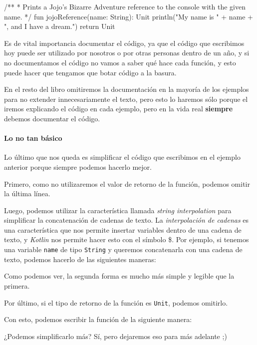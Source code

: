       \begin{kotlin}
        /**
         * Prints a Jojo's Bizarre Adventure reference to the console with the given name.
         */
        fun jojoReference(name: String): Unit {
          println("My name is " + name + ", and I have a dream.")
          return Unit
        }
      \end{kotlin}
      
      Es de vital importancia documentar el código, ya que el código que escribimos hoy puede ser
      utilizado por nosotros o por otras personas dentro de un año, y si no documentamos el código
      no vamos a saber qué hace cada función, y esto puede hacer que tengamos que botar código a la
      basura.

      En el resto del libro omitiremos la documentación en la mayoría de los ejemplos para no
      extender innecesariamente el texto, pero esto lo haremos sólo porque el iremos explicando el
      código en cada ejemplo, pero en la vida real \textbf{siempre} debemos documentar el código.

    \paragraph{Lo no tan básico}
      Lo último que nos queda es simplificar el código que escribimos en el ejemplo anterior porque
      siempre podemos hacerlo mejor.
      
      Primero, como no utilizaremos el valor de retorno de la función, podemos omitir la última 
      línea.
      
      Luego, podemos utilizar la característica llamada \textit{string interpolation} para
      simplificar la concatenación de cadenas de texto.
      La \textit{interpolación de cadenas} es una característica que nos permite insertar variables
      dentro de una cadena de texto, y \textit{Kotlin} nos permite hacer esto con el símbolo \$.
      Por ejemplo, si tenemos una variable \texttt{name} de tipo \texttt{String} y queremos
      concatenarla con una cadena de texto, podemos hacerlo de las siguientes maneras:


      Como podemos ver, la segunda forma es mucho más simple y legible que la primera.

      Por último, si el tipo de retorno de la función es \texttt{Unit}, podemos omitirlo.

      Con esto, podemos escribir la función de la siguiente manera:


      ¿Podemos simplificarlo más?
      Sí, pero dejaremos eso para más adelante ;)